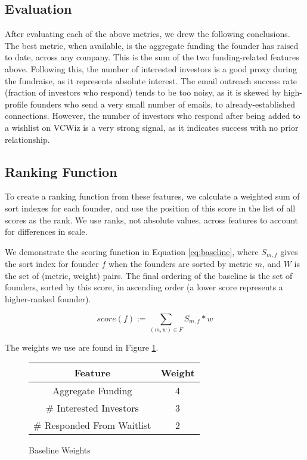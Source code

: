 \subsection{Evaluation}

After evaluating each of the above metrics, we drew the following conclusions. The best metric, when available, is the aggregate funding the founder has raised to date, across any company. This is the sum of the two funding-related features above. Following this, the number of interested investors is a good proxy during the fundraise, as it represents absolute interest. The email outreach success rate (fraction of investors who respond) tends to be too noisy, as it is skewed by high-profile founders who send a very small number of emails, to already-established connections. However, the number of investors who respond after being added to a wishlist on VCWiz is a very strong signal, as it indicates success with no prior relationship.

\subsection{Ranking Function}

To create a ranking function from these features, we calculate a weighted sum of sort indexes for each founder, and use the position of this score in the list of all scores as the rank. We use ranks, not absolute values, across features to account for differences in scale.

We demonstrate the scoring function in Equation \ref{eq:baseline}, where $S_{m, f}$ gives the sort index for founder $f$ when the founders are sorted by metric $m$, and $W$ is the set of (metric, weight) pairs. The final ordering of the baseline is the set of founders, sorted by this score, in ascending order (a lower score represents a higher-ranked founder).

\begin{equation}
\label{eq:baseline}
  score(f) := \sum_{(m, w) \in F} S_{m, f} * w
\end{equation}

\noindent The weights we use are found in Figure \ref{fig:nfr:baseline:weights}.

\begin{figure}[ht]
\begin{tabular}{c | c}
\textbf{Feature}           & \textbf{Weight} \\\hline
Aggregate Funding          & 4 \\\hline
\# Interested Investors    & 3 \\\hline
\# Responded From Waitlist & 2
\end{tabular}
\centering
\caption{Baseline Weights}
\label{fig:nfr:baseline:weights}
\end{figure}

